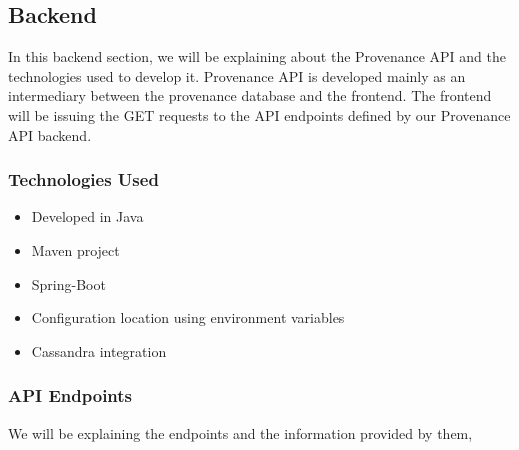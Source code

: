 \subsection{Backend}

In this backend section, we will be explaining about the Provenance API and the technologies used to develop it. Provenance API is developed mainly as an intermediary between the provenance database and the frontend.
The frontend will be issuing the GET requests to the API endpoints defined by our Provenance API backend.

\subsubsection{Technologies Used}

    \begin{itemize}
        \item Developed in Java
        \item Maven project
        \item Spring-Boot
        \item Configuration location using environment variables
        \item Cassandra integration
    \end{itemize}

\subsubsection{API Endpoints}

We will be explaining the endpoints and the information provided by them,

